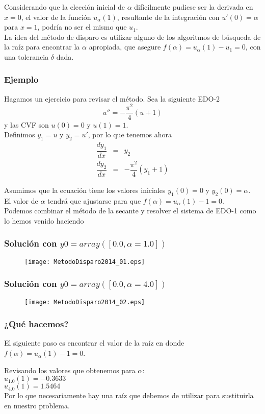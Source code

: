 \begin{frame}
Considerando que la elección inicial de  $\alpha$ difícilmente pudiese ser la derivada en $x = 0$, el valor de la función $u_{\alpha} (1)$, resultante de la integración con $u'(0) = \alpha$  para $x = 1$, podría no ser el mismo que $u_{1}$.
\\
\medskip
La idea del método de disparo es utilizar alguno de los algoritmos de búsqueda de la raíz para encontrar la $\alpha$ apropiada, que asegure $f(\alpha) = u_{\alpha} (1) - u_{1} = 0$, con una tolerancia $\delta$ dada.
\end{frame}
\begin{frame}
\frametitle{Ejemplo}
Hagamos un ejercicio para revisar el método. Sea la siguiente EDO-2
\begin{equation}
u'' = - \dfrac{\pi^{2}}{4}(u+1)
\end{equation}
y las CVF son $u(0)=0$ y $u(1)=1$. 
\\
\medskip
\pause
Definimos $y_{1}=u$ y $y_{2}=u'$, por lo que tenemos ahora
\begin{eqnarray}
\dfrac{dy_{1}}{dx} &=& y_{2} \\
\dfrac{dy_{2}}{dx} &=& - \dfrac{\pi^{2}}{4}(y_{1} + 1)
\end{eqnarray}
\end{frame}
\begin{frame}
Asumimos que la ecuación tiene los valores iniciales $y_{1}(0)=0$ y $y_{2}(0) = \alpha$.
\\
\medskip
\pause
El valor de $\alpha$ tendrá que ajustarse para que $f(\alpha) = u_{\alpha}(1) - 1 = 0$.
\\
\medskip
Podemos combinar el método de la secante y resolver el sistema de EDO-1 como lo hemos venido haciendo
\end{frame}
\begin{frame}[fragile]
\frametitle{Solución con $y0 = array([0.0,\alpha=1.0])$}
\begin{figure}
	\centering
	\texttt{[image: MetodoDisparo2014\_01.eps]}
\end{figure}
\end{frame}
\begin{frame}[fragile]
\frametitle{Solución con $y0 = array([0.0,\alpha=4.0])$}
\begin{figure}
	\centering
	\texttt{[image: MetodoDisparo2014\_02.eps]}
\end{figure}
\end{frame}
\begin{frame}
\frametitle{¿Qué hacemos?}
El siguiente paso es encontrar el valor de la raíz en donde $f(\alpha) = u_{\alpha}(1) - 1 = 0$.
\\
\medskip

Revisando los valores que obtenemos para $\alpha$:
\\
\medskip
$u_{1.0}(1) = -0.3633$ \\
$u_{4.0}(1) = 1.5464$
\\
\medskip
Por lo que necesariamente hay una raíz que debemos de utilizar para sustituirla en nuestro problema.
\end{frame}
